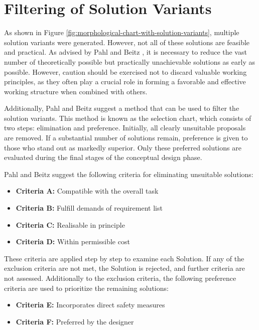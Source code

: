 \section{Filtering of Solution Variants}
\label{sec:filtering-of-solution-variants}
As shown in Figure \ref{fig:morphological-chart-with-solution-variants}, multiple solution variants were generated. However, not all of these solutions are feasible and practical. As advised by Pahl and Beitz \cite{Pahl07s}, it is necessary to reduce the vast number of theoretically possible but practically unachievable solutions as early as possible. However, caution should be exercised not to discard valuable working principles, as they often play a crucial role in forming a favorable and effective working structure when combined with others.

Additionally, Pahl and Beitz \cite{Pahl07s} suggest a method that can be used to filter the solution variants. This method is known as the selection chart, which consists of two steps: elimination and preference. Initially, all clearly unsuitable proposals are removed. If a substantial number of solutions remain, preference is given to those who stand out as markedly superior. Only these preferred solutions are evaluated during the final stages of the conceptual design phase.

Pahl and Beitz suggest the following criteria for eliminating unsuitable solutions:
\begin{itemize}
    \item \textbf{Criteria A:} Compatible with the overall task
    \item \textbf{Criteria B:} Fulfill demands of requirement list
    \item \textbf{Criteria C:} Realisable in principle
    \item \textbf{Criteria D:} Within permissible cost
\end{itemize}

These criteria are applied step by step to examine each Solution. If any of the exclusion criteria are not met, the Solution is rejected, and further criteria are not assessed. Additionally to the exclusion criteria, the following preference criteria are used to prioritize the remaining solutions:

\begin{itemize}
    \item \textbf{Criteria E:} Incorporates direct safety measures
    \item \textbf{Criteria F:} Preferred by the designer
\end{itemize}

